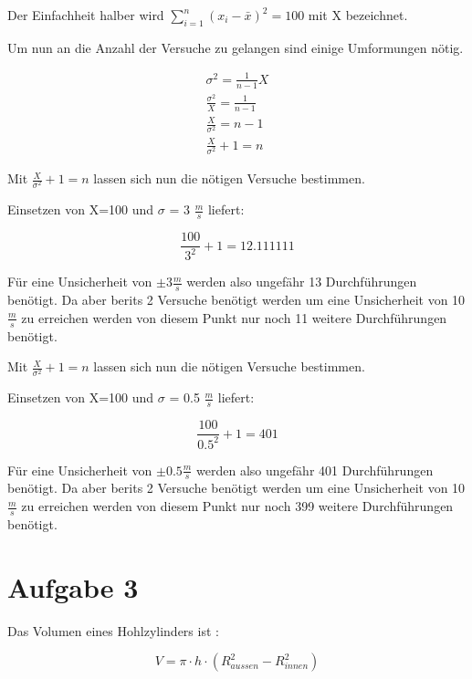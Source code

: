 \documentclass{scrartcl}
\begin{document}
Der Einfachheit halber wird $\sum_{i=1}^{n} (x_i - \bar{x})^2 = 100$ mit X bezeichnet.

Um nun an die Anzahl der Versuche zu gelangen sind einige Umformungen nötig.

\begin{align}
    \sigma^2 = \frac{1}{n-1} X            \nonumber \\
    \frac{\sigma^2}{X} = \frac{1}{n-1}    \nonumber \\
    \frac{X}{\sigma^2} = n -1             \nonumber \\
    \frac{X}{\sigma^2} + 1 = n              \nonumber
\end{align}

Mit $\frac{X}{\sigma^2} + 1 = n$ lassen sich nun die nötigen Versuche bestimmen. 

Einsetzen von X=100 und $\sigma$ = 3 $\frac{m}{s}$ liefert:

\begin{displaymath}
    \frac{100}{3^2} + 1 = 12.111111 
\end{displaymath}

Für eine Unsicherheit von $\pm3 \frac{m}{s}$ werden also ungefähr 13 Durchführungen benötigt.
Da aber berits 2 Versuche benötigt werden um eine Unsicherheit von 10 $\frac{m}{s}$ zu erreichen werden von diesem Punkt nur noch 11 weitere Durchführungen benötigt.

Mit $\frac{X}{\sigma^2} + 1 = n$ lassen sich nun die nötigen Versuche bestimmen. 

Einsetzen von X=100 und $\sigma$ = 0.5 $\frac{m}{s}$ liefert:

\begin{displaymath}
    \frac{100}{0.5^2} + 1 = 401
\end{displaymath}

Für eine Unsicherheit von $\pm0.5 \frac{m}{s}$ werden also ungefähr 401 Durchführungen benötigt.
Da aber berits 2 Versuche benötigt werden um eine Unsicherheit von 10 $\frac{m}{s}$ zu erreichen werden von diesem Punkt nur noch 399 weitere Durchführungen benötigt.

\section{Aufgabe 3}

Das Volumen eines Hohlzylinders ist :

\begin{displaymath}
    V=\pi \cdot h \cdot (R_{aussen}^2-R_{innen}^2)
\end{displaymath}
\end{document}
